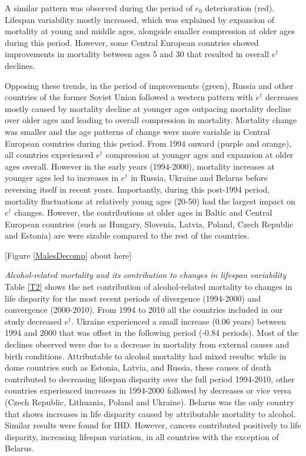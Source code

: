 \documentclass{article}
\begin{document}
\begin{spacing}{1.5}
A similar pattern was observed during the period of $e_0$ deterioration (red). Lifespan variability mostly increased, which was explained by expansion of mortality at young and middle ages, alongside smaller compression at older ages during this period.  However, some Central European countries showed improvements in mortality between ages 5 and 30 that resulted in overall $e^\dagger$ declines.

Opposing these trends, in the period of improvements (green), Russia and other countries of the former Soviet Union followed a western pattern with $e^\dagger$ decreases mostly caused by mortality decline at younger ages outpacing mortality decline over older ages and leading to overall compression in mortality. Mortality change was smaller and the age patterns of change were more variable in Central European countries during this period.
From 1994 onward (purple and orange), all countries experienced $e^\dagger$ compression at younger ages and expansion at older ages overall. However in the early years (1994-2000), mortality increases at younger ages led to increases in $e^\dagger$ in Russia, Ukraine and Belarus before reversing itself in recent years. Importantly, during this post-1994 period, mortality fluctuations at relatively young ages (20-50) had the largest impact on $e^\dagger$ changes. However, the contributions at older ages in Baltic and Central European countries (such as Hungary, Slovenia, Latvia, Poland, Czech Republic and Estonia) are were sizable compared to the rest of the countries.\\



\begin{center}
[Figure \ref{MalesDecomp} about here]\\
\end{center}

\emph{Alcohol-related mortality and its contribution to changes in lifespan variability}\\

Table \ref{T2} shows the net contribution of alcohol-related mortality to changes in life disparity for the most recent periods of divergence (1994-2000) and convergence (2000-2010). From 1994 to 2010 all the countries included in our study decreased $e^\dagger$. Ukraine experienced a small increase (0.06 years) between 1994 and 2000 that was offset in the following period (-0.84 periods). Most of the declines observed were due to a decrease in mortality from external causes and birth conditions. Attributable to alcohol mortality had mixed results: while in dome countries such as Estonia, Latvia, and Russia, these causes of death contributed to decreasing lifespan disparity over the full period 1994-2010, other countries experienced increases in 1994-2000 followed by decreases or vice versa (Czech Republic, Lithuania, Poland and Ukraine). Belarus was the only country that shows increases in life disparity caused by attributable mortality to alcohol. Similar results were found for IHD. However, cancers contributed positively to life disparity, increasing lifespan variation, in all countries with the exception of Belarus. 


\end{spacing}
\end{document}
